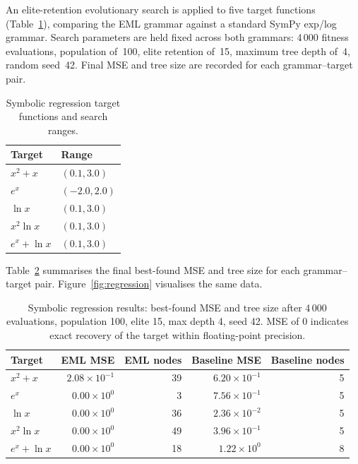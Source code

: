 \documentclass[11pt,a4paper]{article}
\begin{document}
An elite-retention evolutionary search is applied to five target
functions (Table~\ref{tab:targets}), comparing the EML grammar against
a standard SymPy exp/log grammar. Search parameters are held fixed
across both grammars: 4\,000 fitness evaluations, population of~100,
elite retention of~15, maximum tree depth of~4, random seed~42.
Final MSE and tree size are recorded for each grammar--target pair.

\begin{table}[h]
\centering
\small
\begin{tabular}{ll}
\toprule
\textbf{Target} & \textbf{Range} \\
\midrule
$x^2 + x$         & $(0.1, 3.0)$ \\
$e^x$             & $(-2.0, 2.0)$ \\
$\ln x$           & $(0.1, 3.0)$ \\
$x^2 \ln x$       & $(0.1, 3.0)$ \\
$e^x + \ln x$     & $(0.1, 3.0)$ \\
\bottomrule
\end{tabular}
\caption{Symbolic regression target functions and search ranges.}
\label{tab:targets}
\end{table}

Table~\ref{tab:regression_results} summarises the final best-found MSE
and tree size for each grammar--target pair.
Figure~\ref{fig:regression} visualises the same data.

\begin{table}[h]
\centering
\small
\begin{tabular}{lrrrr}
\toprule
\textbf{Target}
  & \textbf{EML MSE}
  & \textbf{EML nodes}
  & \textbf{Baseline MSE}
  & \textbf{Baseline nodes} \\
\midrule
$x^2 + x$       & $2.08 \times 10^{-1}$ & 39 & $6.20 \times 10^{-1}$ &  5 \\
$e^x$           & $0.00 \times 10^{0}$  &  3 & $7.56 \times 10^{-1}$ &  5 \\
$\ln x$         & $0.00 \times 10^{0}$  & 36 & $2.36 \times 10^{-2}$ &  5 \\
$x^2 \ln x$     & $0.00 \times 10^{0}$  & 49 & $3.96 \times 10^{-1}$ &  5 \\
$e^x + \ln x$   & $0.00 \times 10^{0}$  & 18 & $1.22 \times 10^{0}$  &  8 \\
\bottomrule
\end{tabular}
\caption{%
  Symbolic regression results: best-found MSE and tree size after
  4\,000 evaluations, population 100, elite 15, max depth 4, seed 42.
  MSE of $0$ indicates exact recovery of the target within
  floating-point precision.
}
\label{tab:regression_results}
\end{table}
\end{document}
